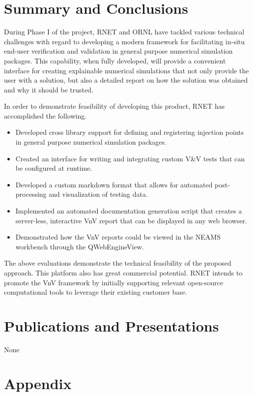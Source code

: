 \section{Summary and Conclusions}

During Phase I of the project, RNET and ORNL have tackled various technical 
challenges with regard to developing a modern framework for facilitating 
in-situ end-user verification and validation in general purpose numerical 
simulation packages.  This capability, when fully 
developed, will provide a convenient interface for creating explainable numerical 
simulations that not only provide the user with a solution, but also a detailed 
report on how the solution was obtained and why it should be trusted. 

In order to demonstrate 
feasibility of developing this product, RNET has accomplished the 
following.

\begin{itemize}
 \item Developed cross library support for defining and registering injection points in general purpose numerical simulation packages.
 \item Created an interface for writing and integrating custom V\&V tests that can be configured at runtime.
 \item Developed a custom markdown format that allows for automated post-processing and visualization of testing data.
 \item Implemented an automated documentation generation script that creates a server-less, interactive VnV report that can be 
 displayed in any web browser. 
 \item Demonstrated how the VnV reports could be viewed in the NEAMS workbench through the QWebEngineView. 
\end{itemize}

The above evaluations demonstrate the technical feasibility of the proposed 
approach.  This 
platform also has great commercial potential. RNET intends to promote 
the VnV framework by initially supporting relevant open-source computational tools to 
leverage their existing customer base. 


\section{Publications and Presentations}
None


\section{Appendix}

